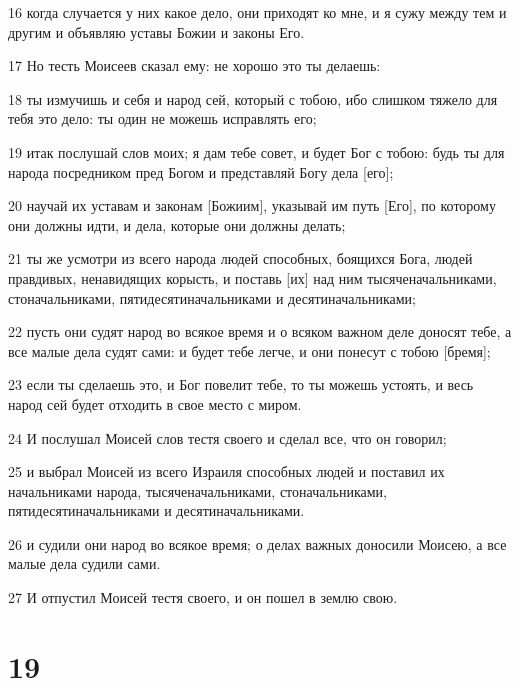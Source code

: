 \par 16 когда случается у них какое дело, они приходят ко мне, и я сужу между тем и другим и объявляю уставы Божии и законы Его.
\par 17 Но тесть Моисеев сказал ему: не хорошо это ты делаешь:
\par 18 ты измучишь и себя и народ сей, который с тобою, ибо слишком тяжело для тебя это дело: ты один не можешь исправлять его;
\par 19 итак послушай слов моих; я дам тебе совет, и будет Бог с тобою: будь ты для народа посредником пред Богом и представляй Богу дела [его];
\par 20 научай их уставам и законам [Божиим], указывай им путь [Его], по которому они должны идти, и дела, которые они должны делать;
\par 21 ты же усмотри из всего народа людей способных, боящихся Бога, людей правдивых, ненавидящих корысть, и поставь [их] над ним тысяченачальниками, стоначальниками, пятидесятиначальниками и десятиначальниками;
\par 22 пусть они судят народ во всякое время и о всяком важном деле доносят тебе, а все малые дела судят сами: и будет тебе легче, и они понесут с тобою [бремя];
\par 23 если ты сделаешь это, и Бог повелит тебе, то ты можешь устоять, и весь народ сей будет отходить в свое место с миром.
\par 24 И послушал Моисей слов тестя своего и сделал все, что он говорил;
\par 25 и выбрал Моисей из всего Израиля способных людей и поставил их начальниками народа, тысяченачальниками, стоначальниками, пятидесятиначальниками и десятиначальниками.
\par 26 и судили они народ во всякое время; о делах важных доносили Моисею, а все малые дела судили сами.
\par 27 И отпустил Моисей тестя своего, и он пошел в землю свою.

\chapter{19}

